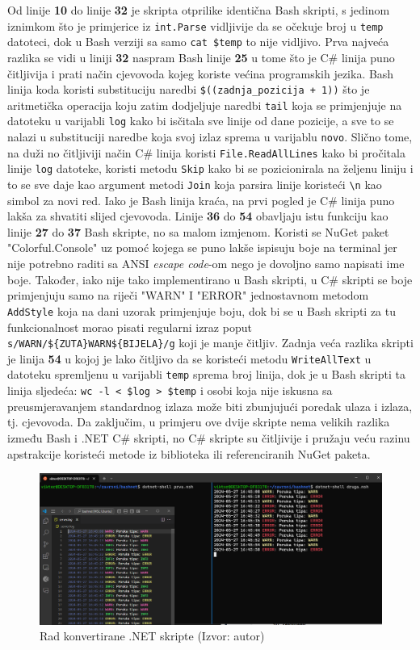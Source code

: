 \documentclass{foi}
\begin{document}
Od linije \textbf{10} do linije \textbf{32} je skripta otprilike identična Bash skripti, s jedinom iznimkom što je primjerice iz \verb|int.Parse| vidljivije da se očekuje broj u \verb|temp| datoteci, dok u Bash verziji sa samo \verb|cat $temp| to nije vidljivo. Prva najveća razlika se vidi u liniji \textbf{32} naspram Bash linije \textbf{25} u tome što je C\# linija puno čitljivija i prati način cjevovoda kojeg koriste većina programskih jezika. Bash linija koda koristi substituciju naredbi \verb|$((zadnja_pozicija + 1))| što je aritmetička operacija koju zatim dodjeljuje naredbi \verb|tail| koja se primjenjuje na datoteku u varijabli \verb|log| kako bi isčitala sve linije od dane pozicije, a sve to se nalazi u substituciji naredbe koja svoj izlaz sprema u varijablu \verb|novo|. Slično tome, na duži no čitljiviji način C\# linija koristi \verb|File.ReadAllLines| kako bi pročitala linije \verb|log| datoteke, koristi metodu \verb|Skip| kako bi se pozicionirala na željenu liniju i to se sve daje kao argument metodi \verb|Join| koja parsira linije koristeći \verb|\n| kao simbol za novi red. Iako je Bash linija kraća, na prvi pogled je C\# linija puno lakša za shvatiti slijed cjevovoda. Linije \textbf{36} do \textbf{54} obavljaju istu funkciju kao linije \textbf{27} do \textbf{37} Bash skripte, no sa malom izmjenom. Koristi se NuGet paket "Colorful.Console" uz pomoć kojega se puno lakše ispisuju boje na terminal jer nije potrebno raditi sa ANSI \textit{escape code}-om nego je dovoljno samo napisati ime boje. Također, iako nije tako implementirano u Bash skripti, u C\# skripti se boje primjenjuju samo na riječi "WARN" I "ERROR" jednostavnom metodom \verb|AddStyle| koja na dani uzorak primjenjuje boju, dok bi se u Bash skripti za tu funkcionalnost morao pisati regularni izraz poput \verb+s/WARN/${ZUTA}WARN${BIJELA}/g+ koji je manje čitljiv. Zadnja veća razlika skripti je linija \textbf{54} u kojoj je lako čitljivo da se koristeći metodu \verb|WriteAllText| u datoteku spremljenu u varijabli \verb|temp| sprema broj linija, dok je u Bash skripti ta linija sljedeća: \texttt{wc -l < \$log > \$temp} i osobi koja nije iskusna sa preusmjeravanjem standardnog izlaza može biti zbunjujući poredak ulaza i izlaza, tj. cjevovoda. Da zaključim, u primjeru ove dvije skripte nema velikih razlika između Bash i .NET C\# skripti, no C\# skripte su čitljivije i pružaju veću razinu apstrakcije koristeći metode iz biblioteka ili referenciranih NuGet paketa.

\begin{figure}[H]
    \centering
    \includegraphics[width=1\textwidth]{slike/bashunet.png}
    \caption{Rad konvertirane .NET skripte (Izvor: autor)}
    \label{fig:bashunet}
\end{figure}
\end{document}
